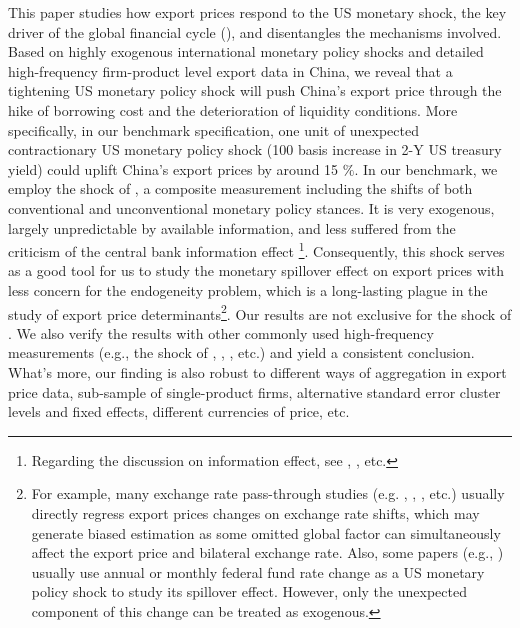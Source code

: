 This paper studies how export prices respond to the US monetary shock, the key driver of the global financial cycle (\cite{miranda2020us}), and disentangles the mechanisms involved. Based on highly exogenous international monetary policy shocks and detailed high-frequency firm-product level export data in China, we reveal that a tightening US monetary policy shock will push China's export price through the hike of borrowing cost and the deterioration of liquidity conditions. More specifically, in our benchmark specification, one unit of unexpected contractionary US monetary policy shock (100 basis increase in 2-Y US treasury yield) could uplift China's export prices by around 15 $\%$. In our benchmark, we employ the shock of \cite{bu2021unified}, a composite measurement including the shifts of both conventional and unconventional monetary policy stances. It is very exogenous, largely unpredictable by available information, and less suffered from the criticism of the central bank information effect \footnote{Regarding the discussion on information effect, see \cite{nakamura2018high}, \cite{jarocinski2020deconstructing}, etc.}. Consequently, this shock serves as a good tool for us to study the monetary spillover effect on export prices with less concern for the endogeneity problem, which is a long-lasting plague in the study of export price determinants\footnote{For example, many exchange rate pass-through studies (e.g. \cite{gopinath2010-currency}, \cite{gopinath2014handbook}, \cite{gopinath2020dominant}, etc.) usually directly regress export prices changes on exchange rate shifts, which may generate biased estimation as some omitted global factor can simultaneously affect the export price and bilateral exchange rate. Also, some papers (e.g., \cite{lin2018international}) usually use annual or monthly federal fund rate change as a US monetary policy shock to study its spillover effect. However, only the unexpected component of this change can be treated as exogenous.}. Our results are not exclusive for the shock of \cite{bu2021unified}. We also verify the results with other commonly used high-frequency measurements (e.g., the shock of \cite{guraynak2005actions}, \cite{nakamura2018high}, \cite{jarocinski2020deconstructing}, etc.) and yield a consistent conclusion. What's more, our finding is also robust to different ways of aggregation in export price data, sub-sample of single-product firms, alternative standard error cluster levels and fixed effects, different currencies of price, etc. 

